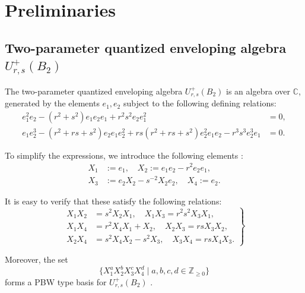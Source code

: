 \documentclass[12 pt,reqno]{amsart}
\numberwithin{equation}{section}
\newcommand{\C}{\mathbb{C}}
\theoremstyle{definition}
\theoremstyle{definition}
\theoremstyle{remark}
\theoremstyle{remark}
\begin{document}
\section{Preliminaries} 
\subsection{\texorpdfstring {Two-parameter quantized enveloping algebra $U_{r,s}^+(B_2)$}{}}
The two-parameter quantized enveloping algebra $U^+_{r,s}(B_2) $ is an algebra over $\C$, generated by the elements $ e_1, e_2$ subject to the following defining relations:
\begin{align*}
    e_1^2 e_2 - (r^2 + s^2) e_1 e_2 e_1 + r^2 s^2 e_2 e_1^2 &= 0,\\
    e_1 e_2^3 - (r^2 + rs + s^2) e_2 e_1 e_2^2 + rs(r^2 + rs + s^2) e_2^2 e_1 e_2 - r^3 s^3 e_2^3 e_1 &= 0.\end{align*}

To simplify the expressions, we introduce the following elements \cite[Lemma 1.1]{Tang1}:
    \begin{align*}
    X_1 &:= e_1,\quad X_2 := e_1 e_2 - r^2 e_2 e_1,
     \\
    X_3 &:= e_2 X_2 - s^{-2} X_2 e_2,\quad X_4 := e_2.
    \end{align*}
    
It is easy to verify that these satisfy the following relations:
\begin{equation}\label{Eq2.1}
    \left.\begin{aligned}
    X_1 X_2 &= s^2 X_2 X_1,\quad X_1 X_3 = r^2 s^2 X_3 X_1,\\
X_1 X_4 &= r^2 X_4 X_1 + X_2, \quad X_2 X_3 = rs X_3 X_2, \\
    X_2 X_4 &= s^2 X_4 X_2 - s^2 X_3,\quad  X_3 X_4 = rs X_4 X_3.
\end{aligned}\right\}\end{equation}

Moreover, the set  
$$
    \{X_1^a X_2^b X_3^c X_4^d \mid a, b, c, d \in \mathbb{Z}_{\geq 0} \}
$$
forms a PBW type basis for $U^+_{r,s}(B_2) $ \cite[Corollay 1.1]{Tang1}.
\end{document}
